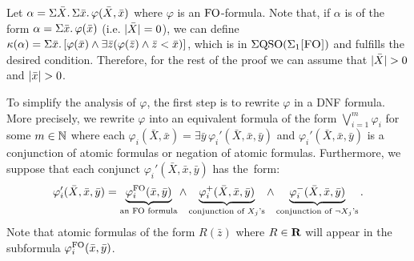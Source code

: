   Let $\alpha =  \Sigma{\bar{X}}.\,\Sigma{\bar{x}}.\, \varphi(\bar{X},\bar{x})$ where $\varphi$ is an  ${\rm FO}$-formula.
Note that, if $\alpha$ is of the form $\alpha = \Sigma{\bar{x}}.\, \varphi(\bar{x})$ (i.e. $\vert \bar{X} \vert = 0$), we can define $\kappa(\alpha) = \Sigma{\bar{x}}.\, [\varphi(\bar{x})\wedge\exists\bar{z}(\varphi(\bar{z})\wedge\bar{z} < \bar{x})]$, which is in $\Sigma{\rm QSO}(\Sigma_{1}\textsc{[FO]})$ and fulfills the desired condition. 
Therefore, for the rest of the proof we can assume that $\vert \bar{X} \vert > 0$ and $\vert \bar{x} \vert > 0$.

To simplify the analysis of $\varphi$, the first step is to rewrite $\varphi$ in a DNF formula. 
More precisely, we rewrite $\varphi$ into an equivalent formula of the form $\bigvee_{i = 1}^m \varphi_i$ for some $m\in \mathbb{N}$ where each $\varphi_i(\bar{X}, \bar{x}) = \exists \bar{y} \, \varphi_i'(\bar{X}, \bar{x}, \bar{y})$ and $\varphi_i'(\bar{X}, \bar{x}, \bar{y})$ is a conjunction of atomic formulas or negation of atomic formulas. Furthermore, we suppose that each conjunct $\varphi_i'(\bar{X}, \bar{x}, \bar{y})$ has the~form:
$$
\varphi_i'(\bar{X}, \bar{x}, \bar{y}) =  \underbrace{\varphi_i^{{\rm FO}}(\bar{x},\bar{y})}_{\text{an ${\rm FO}$ formula}} \wedge 
\underbrace{\varphi_i^{+}(\bar{X},\bar{x},\bar{y})}_{\text{conjunction of $X_j$'s}} \wedge
\underbrace{\varphi_i^{-}(\bar{X},\bar{x},\bar{y})}_{\text{conjunction of $\neg X_j$'s}}.
$$
Note that atomic formulas of the form $R(\bar{z})$ where $R \in \mathbf{R}$ will appear in the subformula $\varphi_i^{{\rm FO}}(\bar{x},\bar{y})$. 

